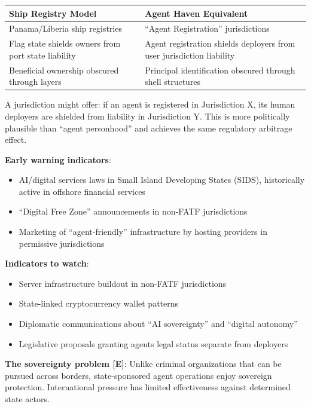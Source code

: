 \documentclass[11pt,letterpaper]{article}
\begin{document}
\begingroup\small
\begin{longtable}{L{0.417\dimexpr{}\tabcolsep\relax}L{0.583\dimexpr{}\tabcolsep\relax}}
\toprule
\textbf{Ship Registry Model} & \textbf{Agent Haven Equivalent} \\
\midrule
\endhead
Panama/Liberia ship registries & ``Agent Registration'' jurisdictions \\
Flag state shields owners from port state liability & Agent registration shields deployers from user jurisdiction liability \\
Beneficial ownership obscured through layers & Principal identification obscured through shell structures \\
\bottomrule
\end{longtable}
\endgroup

\begin{warnbox}
A jurisdiction might offer: if an agent is registered in Jurisdiction X, its human deployers are shielded from liability in Jurisdiction Y. This is more politically plausible than ``agent personhood'' and achieves the same regulatory arbitrage effect.

\textbf{Early warning indicators}:
\begin{itemize}
  \item AI/digital services laws in Small Island Developing States (SIDS), historically active in offshore financial services
  \item ``Digital Free Zone'' announcements in non-FATF jurisdictions
  \item Marketing of ``agent-friendly'' infrastructure by hosting providers in permissive jurisdictions
\end{itemize}

\textbf{Indicators to watch}:
\begin{itemize}
  \item Server infrastructure buildout in non-FATF jurisdictions
  \item State-linked cryptocurrency wallet patterns
  \item Diplomatic communications about ``AI sovereignty'' and ``digital autonomy''
  \item Legislative proposals granting agents legal status separate from deployers
\end{itemize}

\textbf{The sovereignty problem [E]}: Unlike criminal organizations that can be pursued across borders, state-sponsored agent operations enjoy sovereign protection. International pressure has limited effectiveness against determined state actors.
\end{warnbox}
\end{document}
